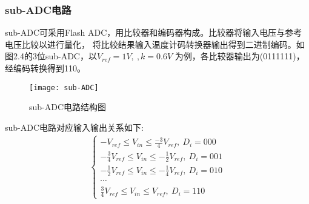 \subsubsection{sub-ADC电路}
    sub-ADC可采用Flash ADC，用比较器和编码器构成。比较器将输入电压与参考电压比较以进行量化，
    将比较结果输入温度计码转换器输出得到二进制编码。如图2.4的3位sub-ADC，以$ V_{ref} = 1V,\ ,k = 0.6V $
    为例，各比较器输出为(0111111)，经编码转换得到110。
    \begin{figure}[ht]
        \centering
        \texttt{[image: sub-ADC]}
        \caption{\label{fig:sub-ADC}sub-ADC电路结构图}
    \end{figure}
    \par sub-ADC电路对应输入输出关系如下:
    \begin{align}
        \left\{
            \begin{array}{l}
            {-V_{ref} \leq V_{in} \leq\frac{-3}{4}V_{r e f},\ D_{i}=000} \\
            { -\frac{3}{4}V_{ref} \leq V_{in} \leq -\frac{1}{2}V_{ref},\ D_{i}=001} \\
            { -\frac{1}{2}V_{ref} \leq V_{in} \leq -\frac{1}{4}V_{ref},\ D_{i}=010} \\
            \cdots \\
            { \frac{3}{4}V_{ref} \leq V_{in} \leq V_{ref},\ D_{i}=110}
        \end{array}\right.
    \end{align}
    

